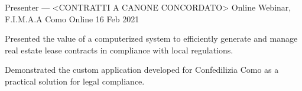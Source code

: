
\begin{cventries}

    \cventry
    {Presenter — <CONTRATTI A CANONE CONCORDATO>}
    {Online Webinar, F.I.M.A.A Como}
    {Online}
    {16 Feb 2021}
    {
        \begin{cvitems}
            \item {Presented the value of a computerized system to efficiently generate and manage real estate lease contracts in compliance with local regulations.}
            \item {Demonstrated the custom application developed for Confedilizia Como as a practical solution for legal compliance.}
        \end{cvitems}
    }

\end{cventries}
